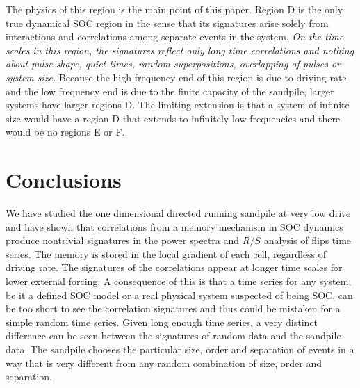 The physics of this region is the main point of this paper.  Region D
is the only true dynamical SOC region in the sense that its signatures
arise solely from interactions and correlations among separate events
in the system.  {\em On the time scales in this region, the signatures
  reflect only long time correlations and nothing about pulse shape,
  quiet times, random superpositions, overlapping of pulses or system
  size.}  Because the high frequency end of this region is due to
driving rate and the low frequency end is due to the finite capacity
of the sandpile, larger systems have larger regions D.  The limiting
extension is that a system of infinite size would have a region D that
extends to infinitely low frequencies and there would be no regions E
or F.

\section{Conclusions}
\label{sec:partI_conclusions}

We have studied the one dimensional directed running sandpile at very
low drive and have shown that correlations from a memory mechanism in
SOC dynamics produce nontrivial signatures in the power spectra and
$R/S$ analysis of flips time series.  The memory is stored in the
local gradient of each cell, regardless of driving rate.  The
signatures of the correlations appear at longer time scales for lower
external forcing.  A consequence of this is that a time series for any
system, be it a defined SOC model or a real physical system suspected
of being SOC, can be too short to see the correlation signatures and
thus could be mistaken for a simple random time series.  Given long
enough time series, a very distinct difference can be seen between the
signatures of random data and the sandpile data.  The sandpile chooses
the particular size, order and separation of events in a way that is
very different from any random combination of size, order and
separation.

